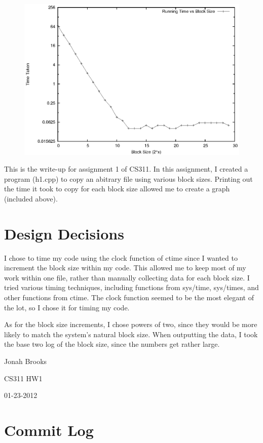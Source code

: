 \documentclass[letterpaper,10pt,twocolumn,titlepage]{article}
\begin{document}
\begin{figure}[h]
\includegraphics{graph.eps}  
\end{figure}

This is the write-up for assignment 1 of CS311. 
In this assignment, I created a program (h1.cpp) to copy an abitrary file using various block sizes. 
Printing out the time it took to copy for each block size allowed me to create a graph (included above).

\section{Design Decisions}
I chose to time my code using the clock function of ctime since I wanted to increment the block size within my code.
This allowed me to keep most of my work within one file, rather than manually collecting data for each block size.
I tried various timing techniques, including functions from sys/time, sys/times, and other functions from ctime.
The clock function seemed to be the most elegant of the lot, so I chose it for timing my code.

As for the block size increments, I chose powers of two, since they would be more likely to match the system's natural block size.
When outputting the data, I took the base two log of the block size, since the numbers get rather large.

\vfill\break

\hfill Jonah Brooks

\hfill CS311 HW1

\hfill 01-23-2012

\vspace*{2.9in}

\section{Commit Log}

\end{document}

